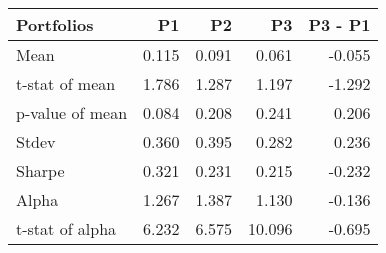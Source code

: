 \begin{tabular}{lrrrr}
\toprule
Portfolios & P1 & P2 & P3 & P3 - P1 \\
\midrule
Mean & 0.115 & 0.091 & 0.061 & -0.055 \\
t-stat of mean & 1.786 & 1.287 & 1.197 & -1.292 \\
p-value of mean & 0.084 & 0.208 & 0.241 & 0.206 \\
Stdev & 0.360 & 0.395 & 0.282 & 0.236 \\
Sharpe & 0.321 & 0.231 & 0.215 & -0.232 \\
Alpha & 1.267 & 1.387 & 1.130 & -0.136 \\
t-stat of alpha & 6.232 & 6.575 & 10.096 & -0.695 \\
\bottomrule
\end{tabular}
